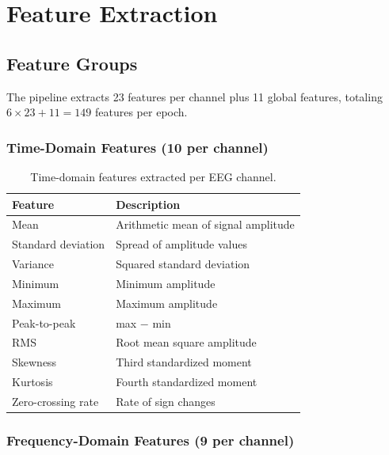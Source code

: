 \section{Feature Extraction}
\label{sec:app_features}

\subsection{Feature Groups}

The pipeline extracts 23 features per channel plus 11 global features, totaling $6 \times 23 + 11 = 149$ features per epoch.

\subsubsection{Time-Domain Features (10 per channel)}

\begin{table}[h]
\centering
\caption{Time-domain features extracted per EEG channel.}
\label{tab:time_features}
\begin{tabular}{l l}
\toprule
\textbf{Feature} & \textbf{Description} \\
\midrule
Mean                 & Arithmetic mean of signal amplitude \\
Standard deviation   & Spread of amplitude values \\
Variance             & Squared standard deviation \\
Minimum              & Minimum amplitude \\
Maximum              & Maximum amplitude \\
Peak-to-peak         & max $-$ min \\
RMS                  & Root mean square amplitude \\
Skewness             & Third standardized moment \\
Kurtosis             & Fourth standardized moment \\
Zero-crossing rate   & Rate of sign changes \\
\bottomrule
\end{tabular}
\end{table}

\subsubsection{Frequency-Domain Features (9 per channel)}

